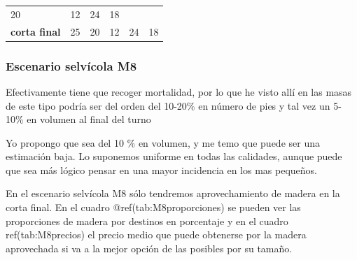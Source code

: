 \documentclass[]{article}
\begin{document}
\begin{longtable}[]{@{}lrrrrr@{}}
\begin{minipage}[t]{0.13\columnwidth}
20\strut
\end{minipage} & \begin{minipage}[t]{0.12\columnwidth}\raggedleft\strut
12\strut
\end{minipage} & \begin{minipage}[t]{0.13\columnwidth}\raggedleft\strut
24\strut
\end{minipage} & \begin{minipage}[t]{0.13\columnwidth}\raggedleft\strut
18\strut
\end{minipage}\tabularnewline
\begin{minipage}[t]{0.21\columnwidth}\raggedright\strut
\textbf{corta final}\strut
\end{minipage} & \begin{minipage}[t]{0.13\columnwidth}\raggedleft\strut
25\strut
\end{minipage} & \begin{minipage}[t]{0.13\columnwidth}\raggedleft\strut
20\strut
\end{minipage} & \begin{minipage}[t]{0.12\columnwidth}\raggedleft\strut
12\strut
\end{minipage} & \begin{minipage}[t]{0.13\columnwidth}\raggedleft\strut
24\strut
\end{minipage} & \begin{minipage}[t]{0.13\columnwidth}\raggedleft\strut
18\strut
\end{minipage}\tabularnewline
\bottomrule
\end{longtable}

\subsubsection{Escenario selvícola M8}\label{escenario-selvuxedcola-m8}

Efectivamente tiene que recoger mortalidad, por lo que he visto allí en
las masas de este tipo podría ser del orden del 10-20\% en número de
pies y tal vez un 5-10\% en volumen al final del turno

Yo propongo que sea del 10 \% en volumen, y me temo que puede ser una
estimación baja. Lo suponemos uniforme en todas las calidades, aunque
puede que sea más lógico pensar en una mayor incidencia en los mas
pequeños.

En el escenario selvícola M8 sólo tendremos aprovechamiento de madera en
la corta final. En el cuadro @ref(tab:M8proporciones) se pueden ver las
proporciones de madera por destinos en porcentaje y en el cuadro
ref(tab:M8precios) el precio medio que puede obtenerse por la madera
aprovechada si va a la mejor opción de las posibles por su tamaño.
\end{document}
